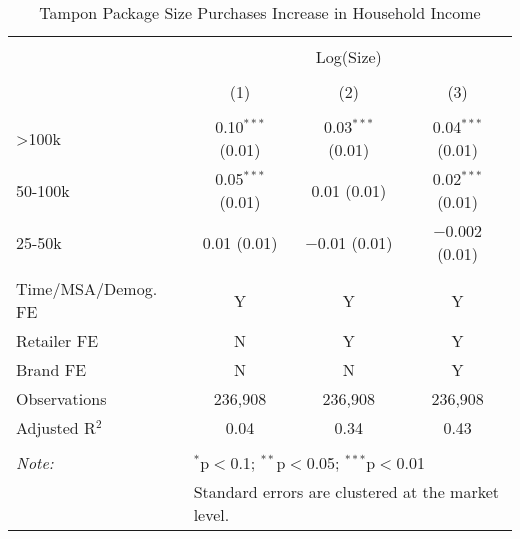 
\begin{table}[!htbp] \centering 
  \caption{Tampon Package Size Purchases Increase in Household Income} 
  \label{tab:packageSizeFullTampon} 
\begin{tabular}{@{\extracolsep{5pt}}lccc} 
\\[-1.8ex]\hline 
\hline \\[-1.8ex] 
 & \multicolumn{3}{c}{Log(Size)} \\ 
\\[-1.8ex] & (1) & (2) & (3)\\ 
\hline \\[-1.8ex] 
 >100k & 0.10$^{***}$ (0.01) & 0.03$^{***}$ (0.01) & 0.04$^{***}$ (0.01) \\ 
  50-100k & 0.05$^{***}$ (0.01) & 0.01 (0.01) & 0.02$^{***}$ (0.01) \\ 
  25-50k & 0.01 (0.01) & $-$0.01 (0.01) & $-$0.002 (0.01) \\ 
 \hline \\[-1.8ex] 
Time/MSA/Demog. FE & Y & Y & Y \\ 
Retailer FE & N & Y & Y \\ 
Brand FE & N & N & Y \\ 
Observations & 236,908 & 236,908 & 236,908 \\ 
Adjusted R$^{2}$ & 0.04 & 0.34 & 0.43 \\ 
\hline 
\hline \\[-1.8ex] 
\textit{Note:}  & \multicolumn{3}{l}{$^{*}$p$<$0.1; $^{**}$p$<$0.05; $^{***}$p$<$0.01} \\ 
 & \multicolumn{3}{l}{Standard errors are clustered at the market level.} \\ 
\end{tabular} 
\end{table} 
